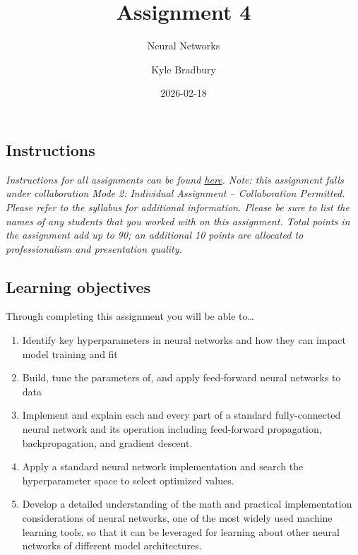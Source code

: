 \documentclass[
  letterpaper,
  DIV=11,
  numbers=noendperiod]{scrartcl}
\title{Assignment 4}
\subtitle{Neural Networks}
\author{Kyle Bradbury}
\date{2026-02-18}
\providecommand{\tightlist}{%
  \setlength{\itemsep}{0pt}\setlength{\parskip}{0pt}}\usepackage{longtable,booktabs,array}
\renewcommand*\contentsname{Table of contents}
\newcommand\contentsname{Table of contents}
\begin{document}
\maketitle

\renewcommand*\contentsname{Table of contents}
{
\hypersetup{linkcolor=}
\setcounter{tocdepth}{1}
\tableofcontents
}

\subsection{Instructions}\label{instructions}

\emph{Instructions for all assignments can be found
\href{https://kylebradbury.github.io/ids705/notebooks/assignment_instructions.html}{here}.
Note: this assignment falls under collaboration Mode 2: Individual
Assignment -- Collaboration Permitted. Please refer to the syllabus for
additional information. Please be sure to list the names of any students
that you worked with on this assignment. Total points in the assignment
add up to 90; an additional 10 points are allocated to professionalism
and presentation quality.}

\subsection{Learning objectives}\label{learning-objectives}

Through completing this assignment you will be able to\ldots{}

\begin{enumerate}
\def\labelenumi{\arabic{enumi}.}
\tightlist
\item
  Identify key hyperparameters in neural networks and how they can
  impact model training and fit
\item
  Build, tune the parameters of, and apply feed-forward neural networks
  to data
\item
  Implement and explain each and every part of a standard
  fully-connected neural network and its operation including
  feed-forward propagation, backpropagation, and gradient descent.
\item
  Apply a standard neural network implementation and search the
  hyperparameter space to select optimized values.
\item
  Develop a detailed understanding of the math and practical
  implementation considerations of neural networks, one of the most
  widely used machine learning tools, so that it can be leveraged for
  learning about other neural networks of different model architectures.
\end{enumerate}
\end{document}
